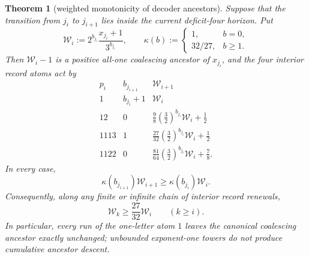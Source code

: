 \documentclass[11pt]{article}
\newtheorem{theorem}{Theorem}
\begin{document}
\begin{theorem}[weighted monotonicity of decoder ancestors]
Suppose that the transition from $j_i$ to $j_{i+1}$ lies inside the
current deficit-four horizon.  Put
\[
  \mathcal W_i:=
  2^{b_{j_i}}\frac{x_{j_i}+1}{3^{b_{j_i}}},
  \qquad
  \kappa(b):=
  \begin{cases}
    1,&b=0,\\
    32/27,&b\geq1.
  \end{cases}
  \tag{38}
\]
Then $\mathcal W_i-1$ is a positive all-one coalescing ancestor of
$x_{j_i}$, and the four interior record atoms act by
\[
\begin{array}{c|c|c}
  p_i&b_{j_{i+1}}&\mathcal W_{i+1}\\ \hline
  1&b_{j_i}+1&\mathcal W_i\\[2pt]
  12&0&
  \displaystyle
  \frac98\left(\frac32\right)^{b_{j_i}}\mathcal W_i+\frac12\\[7pt]
  1113&1&
  \displaystyle
  \frac{27}{32}\left(\frac32\right)^{b_{j_i}}\mathcal W_i+\frac12\\[7pt]
  1122&0&
  \displaystyle
  \frac{81}{64}\left(\frac32\right)^{b_{j_i}}\mathcal W_i+\frac78.
\end{array}
\tag{39}
\]
In every case,
\[
  \boxed{
  \kappa(b_{j_{i+1}})\mathcal W_{i+1}
  \geq
  \kappa(b_{j_i})\mathcal W_i.}
  \tag{40}
\]
Consequently, along any finite or infinite chain of interior record
renewals,
\[
  \mathcal W_k\geq\frac{27}{32}\mathcal W_i
  \qquad(k\geq i).
  \tag{41}
\]
In particular, every run of the one-letter atom $1$ leaves the canonical
coalescing ancestor exactly unchanged; unbounded exponent-one towers do not
produce cumulative ancestor descent.
\end{theorem}
\end{document}

